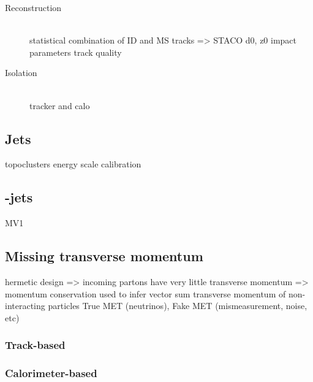 \begin{description}
\item[Reconstruction] \hfill \\
	statistical combination of ID and MS tracks => STACO
	d0, z0 impact parameters
	track quality
\item[Isolation] \hfill \\
	tracker and calo
\end{description}


\subsection{Jets}
\label{sec:objects:jets}

topoclusters
energy scale calibration


\subsection{\Pbottom-jets}
\label{sec:objects:bjets}

MV1


\subsection{Missing transverse momentum}
\label{sec:objects:met}

hermetic design => incoming partons have very little transverse momentum => momentum conservation used to infer vector sum transverse momentum of non-interacting particles
True MET (neutrinos), Fake MET (mismeasurement, noise, etc)

\subsubsection{Track-based \met}

\subsubsection{Calorimeter-based \met}
